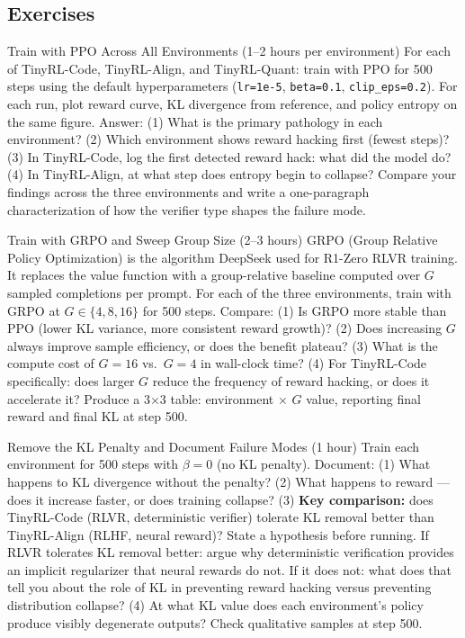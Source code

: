 \subsection{Exercises}

\begin{exercise}{Train with PPO Across All Environments (1--2 hours per environment)}
For each of TinyRL-Code, TinyRL-Align, and TinyRL-Quant: train with PPO for 500 steps using the default hyperparameters (\texttt{lr=1e-5}, \texttt{beta=0.1}, \texttt{clip\_eps=0.2}). For each run, plot reward curve, KL divergence from reference, and policy entropy on the same figure. Answer: (1) What is the primary pathology in each environment? (2) Which environment shows reward hacking first (fewest steps)? (3) In TinyRL-Code, log the first detected reward hack: what did the model do? (4) In TinyRL-Align, at what step does entropy begin to collapse? Compare your findings across the three environments and write a one-paragraph characterization of how the verifier type shapes the failure mode.
\end{exercise}

\begin{exercise}{Train with GRPO and Sweep Group Size (2--3 hours)}
GRPO (Group Relative Policy Optimization) is the algorithm DeepSeek used for R1-Zero RLVR training. It replaces the value function with a group-relative baseline computed over $G$ sampled completions per prompt. For each of the three environments, train with GRPO at $G \in \{4, 8, 16\}$ for 500 steps. Compare: (1) Is GRPO more stable than PPO (lower KL variance, more consistent reward growth)? (2) Does increasing $G$ always improve sample efficiency, or does the benefit plateau? (3) What is the compute cost of $G=16$ vs.\ $G=4$ in wall-clock time? (4) For TinyRL-Code specifically: does larger $G$ reduce the frequency of reward hacking, or does it accelerate it? Produce a 3$\times$3 table: environment $\times$ $G$ value, reporting final reward and final KL at step 500.
\end{exercise}

\begin{exercise}{Remove the KL Penalty and Document Failure Modes (1 hour)}
Train each environment for 500 steps with $\beta = 0$ (no KL penalty). Document: (1) What happens to KL divergence without the penalty? (2) What happens to reward --- does it increase faster, or does training collapse? (3) \textbf{Key comparison:} does TinyRL-Code (RLVR, deterministic verifier) tolerate KL removal better than TinyRL-Align (RLHF, neural reward)? State a hypothesis before running. If RLVR tolerates KL removal better: argue why deterministic verification provides an implicit regularizer that neural rewards do not. If it does not: what does that tell you about the role of KL in preventing reward hacking versus preventing distribution collapse? (4) At what KL value does each environment's policy produce visibly degenerate outputs? Check qualitative samples at step 500.
\end{exercise}

